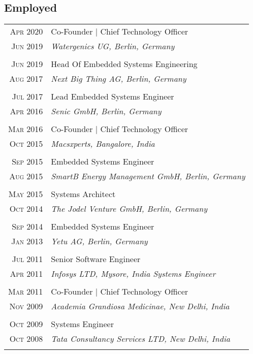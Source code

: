 \subsection{Employed}
\begin{longtable}
	{r|p{12cm}}

	\textsc{Apr 2020} & Co-Founder | Chief Technology Officer\\
	\textsc{Jun 2019}&\emph{Watergenics UG, Berlin, Germany}\\
	\multicolumn{2}{c}{} \\

	\textsc{Jun 2019} & Head Of Embedded Systems Engineering\\
	\textsc{Aug 2017}&\emph{Next Big Thing AG, Berlin, Germany}\\
	\multicolumn{2}{c}{} \\

	\textsc{Jul 2017} & Lead Embedded Systems Engineer\\
	\textsc{Apr 2016}&\emph{Senic GmbH, Berlin, Germany}\\
	\multicolumn{2}{c}{} \\

	\textsc{Mar 2016} & Co-Founder | Chief Technology Officer\\
	\textsc{Oct 2015}&\emph{Macsxperts, Bangalore, India}\\
	\multicolumn{2}{c}{} \\

	\textsc{Sep 2015} & Embedded Systems Engineer\\
	\textsc{Aug 2015}&\emph{SmartB Energy Management GmbH, Berlin, Germany	}\\
	\multicolumn{2}{c}{} \\

	\textsc{May 2015} & Systems Architect\\
	\textsc{Oct 2014}&\emph{The Jodel Venture GmbH, Berlin, Germany	}\\
	\multicolumn{2}{c}{} \\

	\textsc{Sep 2014} & Embedded Systems Engineer\\
	\textsc{Jan 2013} &\emph{Yetu AG, Berlin, Germany	}\\
	\multicolumn{2}{c}{} \\

	\textsc{Jul 2011} & Senior Software Engineer \\
	\textsc{Apr 2011} &\emph{Infosys LTD, Mysore, India	Systems Engineer}\\
	\multicolumn{2}{c}{} \\

	\textsc{Mar 2011} & Co-Founder | Chief Technology Officer\\
	\textsc{Nov 2009} &\emph{Academia Grandiosa Medicinae, New Delhi, India}\\
	\multicolumn{2}{c}{} \\

	\textsc{Oct 2009} & Systems Engineer\\
	\textsc{Oct 2008} &\emph{Tata Consultancy Services LTD, New Delhi, India}\\
	\multicolumn{2}{c}{} \\

\end{longtable}
